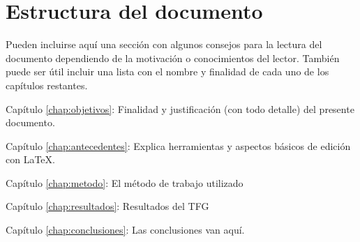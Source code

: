\section{Estructura del documento}

Pueden incluirse aquí una sección con algunos consejos para la lectura del
documento dependiendo de la motivación o conocimientos del lector.  También
puede ser útil incluir una lista con el nombre y finalidad de cada uno de los
capítulos restantes.

\begin{definitionlist}
\item[Capítulo \ref{chap:objetivos}: \nameref{chap:objetivos}] Finalidad y justificación
  (con todo detalle) del presente documento.
 \item[Capítulo \ref{chap:antecedentes}: \nameref{chap:antecedentes}] Explica herramientas
  y aspectos básicos de edición con \LaTeX.
  \item [Capítulo \ref{chap:metodo}: \nameref{chap:metodo}] El método de trabajo utilizado
  \item[Capítulo \ref{chap:resultados}: \nameref{chap:resultados}] Resultados del TFG
  \item[Capítulo \ref{chap:conclusiones}: \nameref{chap:conclusiones}] Las conclusiones van aquí.
\end{definitionlist}


